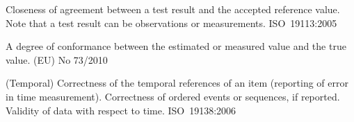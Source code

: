 %
	{Closeness of agreement between a test result and the accepted reference value. Note that a test result can be observations or measurements. ISO\ 19113:2005 \cite{citation:ISO19113}

	A degree of conformance between the estimated or measured value and the true value. (EU) No 73/2010 \cite{citation:EU732010}

	(Temporal)  Correctness of the temporal references of an item (reporting of error in time measurement). Correctness of ordered events or sequences, if reported. Validity of data with respect to time. ISO\ 19138:2006 \cite{citation:ISO19138}}


